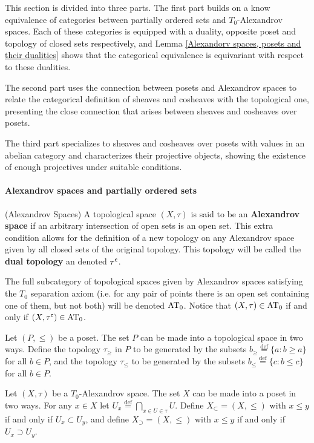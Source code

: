 \documentclass[main.tex]{subfiles}
\begin{document}
This section is divided into three parts. The first part builds on a know equivalence of categories between partially ordered sets and $T_0$-Alexandrov spaces. Each of these categories is equipped with a duality, opposite poset and topology of closed sets respectively, and Lemma \ref{Alexandorv spaces, posets and their dualities} shows that the categorical equivalence is equivariant with respect to these dualities.

The second part uses the connection between posets and Alexandrov spaces to relate the categorical definition of sheaves and cosheaves with the topological one, presenting the close connection that arises between sheaves and cosheaves over posets.

The third part specializes to sheaves and cosheaves over posets with values in an abelian category and characterizes their projective objects, showing the existence of enough projectives under suitable conditions.

\paragraph{Alexandrov spaces and partially ordered sets}
\begin{definition}(Alexandrov Spaces) A topological space $(X,\tau)$ is said to be an \textbf{Alexandrov space} if an arbitrary intersection of open sets is an open set. This extra condition allows for the definition of a new topology on any Alexandrov space given by all closed sets of the original topology. This topology will be called the \textbf{dual topology} an denoted $\tau^{\mathsf{c}}$.

The full subcategory of topological spaces given by Alexandrov spaces satisfying the $T_0$ separation axiom (i.e.\! for any pair of points there is an open set containing one of them, but not both) will be denoted $\AT_0$. Notice that $(X,\tau)\in\AT_0$ if and only if $(X,\tau^{\c})\in\AT_0$.
\end{definition}

\begin{definition}
Let $(P,\leq)$ be a poset. The set $P$ can be made into a topological space in two ways.
Define the topology $\tau_\geq$ in $P$ to be generated by the subsets $b_\geq\stackrel{\mathrm{def}}{=}\{a:b\geq a\}$ for all $b\in P$, and the topology $\tau_\leq$ to be generated by the subsets $b_\leq\stackrel{\mathrm{def}}{=}\{c:b\leq c\}$ for all $b\in P$.\vspace*{6pt}

Let $(X,\tau)$ be a $T_0$-Alexandrov space. The set $X$ can be made into a poset in two ways.
For any $x\in X$ let $U_x\stackrel{\mathrm{def}}{=}\bigcap_{x\in U\in\tau}U$.
Define $X_\subset=(X,\leq)$ with $x\leq y$ if and only if $U_x\subset U_y$, and define $X_\supset=(X,\leq)$ with $x\leq y$ if and only if $U_x\supset U_y$.
\end{definition}
\end{document}
